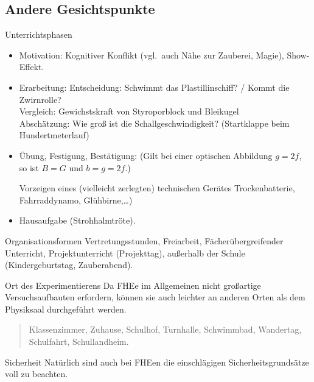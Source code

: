 \subsection{Andere Gesichtspunkte}
\begin{itemize}

	\bitem
	{Unterrichtsphasen}
	\begin{itemize}
		\item
		Motivation:
		Kognitiver Konflikt (vgl.\ auch N\"{a}he zur Zauberei, Magie),
		Show-Effekt.
		\item
		Erarbeitung:
		Entscheidung: Schwimmt das Plastillinschiff? /
		Kommt die Zwirnrolle? \\
		Vergleich: Gewichstskraft von Styroporblock und Bleikugel \\
		Absch\"{a}tzung: Wie gro{\ss} ist die Schallgeschwindigkeit?
		(Startklappe beim Hundertmeterlauf)
		\item
		\"{U}bung, Festigung, Best\"{a}tigung:
		(Gilt bei einer optischen Abbildung
		$g = 2f$, so ist $B=G$ und $b = g = 2f$.)
		
		Vorzeigen eines (vielleicht zerlegten) technischen Ger\"{a}tes
		Trockenbatterie, Fahrraddynamo, Gl\"{u}hbirne,\dots)
		
		\item
		Hausaufgabe (Strohhalmtr\"{o}te).
	\end{itemize}
	
	\bitem
	{Organisationsformen}
	Vertretungsstunden, Freiarbeit, F\"{a}cher\"{u}bergreifender Unterricht,
	Projektunterricht (Projekttag),
	au{\ss}erhalb der Schule (Kindergeburtstag, Zauberabend).
	
	\bitem
	{Ort des Experimentierens}
	Da FHEe im Allgemeinen nicht gro{\ss}artige Versuchsaufbauten
	erfordern, k\"{o}nnen sie auch leichter an anderen Orten
	als dem Physiksaal durchgef\"{u}hrt werden.
	
	\begin{quote}
		Klassenzimmer, Zuhause, Schulhof, Turnhalle,
		Schwimmbad, Wandertag, Schulfahrt, Schul\-land\-heim.
	\end{quote}
	
	\bitem
	{Sicherheit}
	Nat\"{u}rlich sind auch bei FHEen die
	einschl\"{a}gigen Sicherheitsgrunds\"{a}tze voll zu beachten.
	

\end{itemize}
